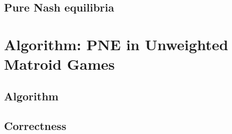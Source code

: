 \documentclass{beamer}
\begin{document}
\subsection{Pure Nash equilibria}
\begin{frame}
\end{frame}

\section{Algorithm: PNE in Unweighted Matroid Games}
\subsection{Algorithm}
\begin{frame}
\end{frame}

\subsection{Correctness}
\begin{frame}
\end{frame}
\end{document}
